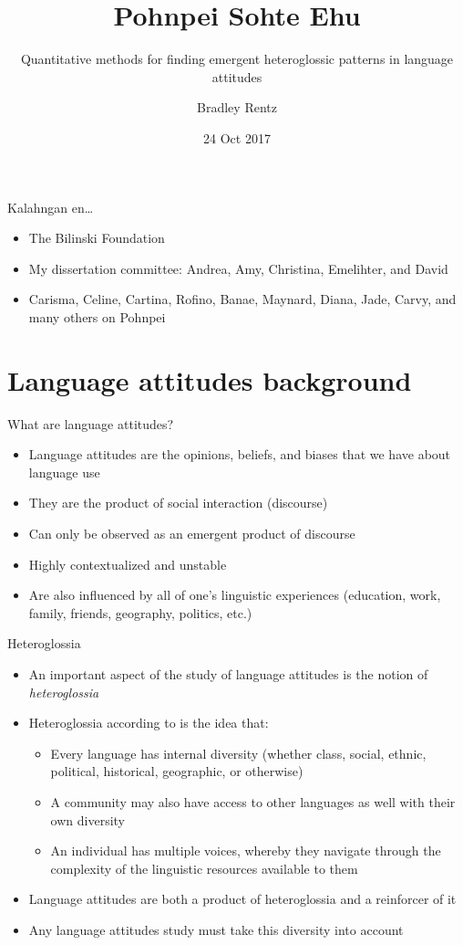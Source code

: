 \documentclass[10pt]{beamer}
\title{Pohnpei Sohte Ehu}
\subtitle{Quantitative methods for finding emergent heteroglossic patterns in language attitudes}
\date{24 Oct 2017}
\author{Bradley Rentz}
\begin{document}
\maketitle

\begin{frame}{Kalahngan en\ldots}
\begin{itemize}
\item The Bilinski Foundation
\item My dissertation committee: Andrea, Amy, Christina, Emelihter, and David
\item Carisma, Celine, Cartina, Rofino, Banae, Maynard, Diana, Jade, Carvy, and many others on Pohnpei
\end{itemize}
\end{frame}

\section{Language attitudes background}

\begin{frame}{What are language attitudes?}

\begin{itemize}
\item Language attitudes are the opinions, beliefs, and biases that we have about language use
\item They are the product of social interaction (discourse) \citep{Potter:1987}
\item Can only be observed as an emergent product of discourse
\item Highly contextualized and unstable
\item Are also influenced by all of one's linguistic experiences (education, work, family, friends, geography, politics, etc.)
\end{itemize}
\end{frame}

\begin{frame}{Heteroglossia}
\begin{itemize}
\item An important aspect of the study of language attitudes is the notion of \emph{heteroglossia}
\item Heteroglossia according to \citet{Bakhtin:1981} is the idea that:
\begin{itemize}
\item Every language has internal diversity (whether class, social, ethnic, political, historical, geographic, or otherwise)
\item A community may also have access to other languages as well with their own diversity
\item An individual has multiple voices, whereby they navigate through the complexity of the linguistic resources available to them
\end{itemize}
\item Language attitudes are both a product of heteroglossia and a reinforcer of it
\item Any language attitudes study must take this diversity into account
\end{itemize}
\end{frame}
\end{document}

